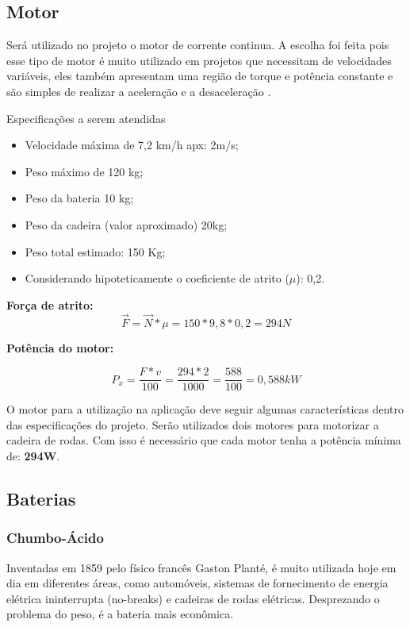 \subsection{Motor}
Será utilizado no projeto o motor de corrente continua. A escolha foi feita pois esse tipo de motor é muito utilizado em projetos que necessitam de velocidades variáveis, eles também apresentam uma região de torque e potência constante e são simples de realizar a aceleração e a desaceleração \cite{manual_bateria_unipower}.

Especificações a serem atendidas
\begin{itemize}
 \item Velocidade máxima de 7,2 km/h apx: 2m/s;
 \item Peso máximo de 120 kg;
 \item Peso da bateria 10 kg;
 \item Peso da cadeira (valor aproximado) 20kg;
 \item Peso total estimado: 150 Kg;
 \item Considerando hipoteticamente o coeficiente de atrito ($\mu$): 0,2.
\end{itemize}

\textbf{Força de atrito:}
\begin{equation}
 \overrightarrow{F} = \overrightarrow{N} * \mu = 150 * 9,8 * 0,2 = 294N
\end{equation}

\textbf{Potência do motor:}

\begin{equation}
 P_{x} = \frac{F * v}{100} = \frac{294 * 2}{1000} = \frac{588}{100} = 0,588kW
\end{equation}

O motor para a utilização na aplicação deve seguir algumas características dentro das especificações do projeto. Serão utilizados dois motores para motorizar a cadeira de rodas. Com isso é necessário que cada motor tenha a potência mínima de: \textbf{294W}.

\subsection{Baterias}
\subsubsection{Chumbo-Ácido}
Inventadas em 1859 pelo físico francês Gaston Planté, é muito utilizada hoje em dia em diferentes áreas, como automóveis, sistemas de fornecimento de energia elétrica ininterrupta (no-breaks) e cadeiras de rodas elétricas. Desprezando o problema do peso, é a bateria mais econômica.

